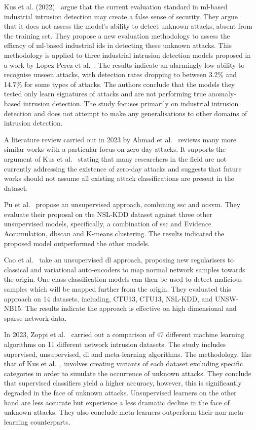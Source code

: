 Kus et al. (2022)~\cite{Kus} argue that the current evaluation standard in
\gls{ml}-based industrial intrusion detection may create a false sense of
security. They argue that it does not assess the model's ability to detect
unknown attacks, absent from the training set. They propose a new evaluation
methodology to assess the efficacy of \gls{ml}-based industrial \gls{ids} in
detecting these unknown attacks. This methodology is applied to three
industrial intrusion detection models proposed in a work by Lopez Perez et
al.~\cite{Perez}. The results indicate an alarmingly low ability to recognise
unseen attacks, with detection rates dropping to between 3.2\% and 14.7\% for
some types of attacks. The authors conclude that the models they tested only
learn signatures of attacks and are not performing true anomaly-based intrusion
detection. The study focuses primarily on industrial intrusion detection and
does not attempt to make any generalisations to other domains of intrusion
detection.

A literature review carried out in 2023 by Ahmad et al.~\cite{zero-day} reviews
many more similar works with a particular focus on zero-day attacks. It
supports the argument of Kus et al.~\cite{Kus} stating that many researchers in
the field are not currently addressing the existence of zero-day attacks and
suggests that future works should not assume all existing attack
classifications are present in the dataset.

Pu et al.~\cite{Pu} propose an unsupervised approach, combining \gls{ssc} and
\gls{ocsvm}. They evaluate their proposal on the NSL-KDD dataset against three
other unsupervised models, specifically, a combination of \gls{ssc} and
Evidence Accumulation, \gls{dbscan} and K-means clustering. The results
indicated the proposed model outperformed the other models.

Cao et al.~\cite{Cao} take an unsupervised \gls{dl} approach, proposing new
regularisers to classical and variational auto-encoders to map normal network
samples towards the origin. One class classification models can then be used to
detect malicious samples which will be mapped further from the origin. They
evaluated this approach on 14 datasets, including, CTU13, CTU13,
NSL-KDD, and UNSW-NB15. The results indicate the approach is effective on high
dimensional and sparse network data.

In 2023, Zoppi et al.~\cite{Zoppi} carried out a comparison of 47 different
machine learning algorithms on 11 different network intrusion datasets. The
study includes supervised, unsupervised, \gls{dl} and meta-learning algorithms.
The methodology, like that of Kus et al.~\cite{Kus}, involves creating variants
of each dataset excluding specific categories in order to simulate the
occurrence of unknown attacks. They conclude that supervised classifiers yield
a higher accuracy, however, this is significantly degraded in the face of
unknown attacks. Unsupervised learners on the other hand are less accurate but
experience a less dramatic decline in the face of unknown attacks. They also
conclude meta-learners outperform their non-meta-learning counterparts.

